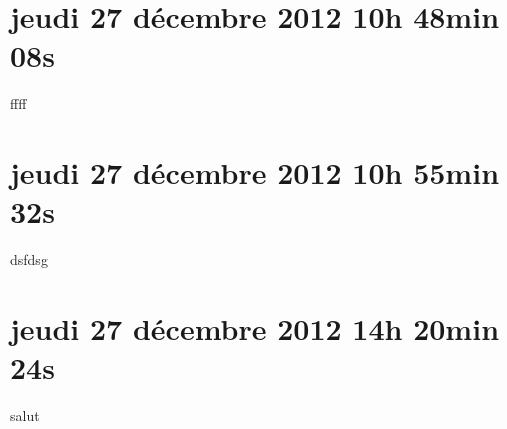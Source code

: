 
\section{jeudi 27 décembre 2012 10h 48min 08s}

ffff

\section{jeudi 27 décembre 2012 10h 55min 32s}

dsfdsg

\section{jeudi 27 décembre 2012 14h 20min 24s}

salut
